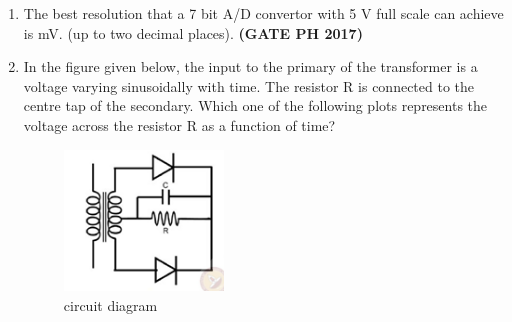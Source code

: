 \documentclass[14pt, a4paper]{extarticle}
\begin{document}
\begin{enumerate}[label=\textbf{Q.\arabic*}]
\item The best resolution that a 7 bit A/D convertor with 5 V full scale can achieve is \underline{\hspace{3cm}} mV. (up to two decimal places).
\hfill \textbf{(GATE PH 2017)}

\item In the figure given below, the input to the primary of the transformer is a voltage varying sinusoidally with time. The resistor R is connected to the centre tap of the secondary. Which one of the following plots represents the voltage across the resistor R as a function of time?
\begin{figure}[H]
\centering
\includegraphics[width=0.4\textwidth]{figs/q6figA17.png}
\caption{circuit diagram}
\label{fig:q6_circuit}
\end{figure}
\begin{enumerate}
\end{enumerate}
\end{enumerate}
\end{document}
